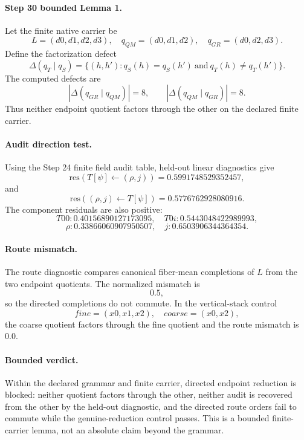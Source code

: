 \paragraph{Step 30 bounded Lemma 1.}
Let the finite native carrier be
\[
L=(d0,d1,d2,d3),
\quad q_{QM}=(d0,d1,d2),
\quad q_{GR}=(d0,d2,d3).
\]
Define the factorization defect
\[
\Delta(q_T \mid q_S)
  =
  \{(h,h') : q_S(h)=q_S(h')\ \mathrm{and}\ q_T(h)\neq q_T(h')\}.
\]
The computed defects are
\[
|\Delta(q_{GR}\mid q_{QM})|=8,
\qquad
|\Delta(q_{QM}\mid q_{GR})|=8.
\]
Thus neither endpoint quotient factors through the other on the declared
finite carrier.

\paragraph{Audit direction test.}
Using the Step 24 finite field audit table, held-out linear diagnostics give
\[
\mathrm{res}(T[\psi]\leftarrow(\rho,j))=0.5991748529352457,
\]
and
\[
\mathrm{res}((\rho,j)\leftarrow T[\psi])=0.5776762928080916.
\]
The component residuals are also positive:
\[
T00:0.40156890127173095,\quad T0i:0.5443048422989993,
\]
\[
\rho:0.33866060907950507,\quad j:0.6503906344364354.
\]

\paragraph{Route mismatch.}
The route diagnostic compares canonical fiber-mean completions of \(L\) from
the two endpoint quotients.  The normalized mismatch is
\[
0.5,
\]
so the directed completions do not commute.  In the vertical-stack control
\[
fine=(x0,x1,x2),\quad coarse=(x0,x2),
\]
the coarse quotient factors through the fine quotient and the route mismatch
is \(0.0\).

\paragraph{Bounded verdict.}
Within the declared grammar and finite carrier, directed endpoint reduction is
blocked: neither quotient factors through the other, neither audit is
recovered from the other by the held-out diagnostic, and the directed route
orders fail to commute while the genuine-reduction control passes.  This is a
bounded finite-carrier lemma, not an absolute claim beyond the grammar.
